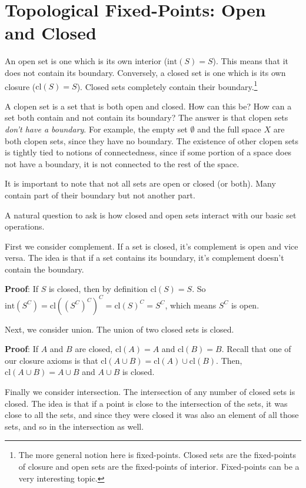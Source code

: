 \documentclass{report}
\newcommand{\cl}{\mathrm{cl}}
\newcommand{\intr}{\mathrm{int}}
\begin{document}
\section{Topological Fixed-Points: Open and Closed}

An open set is one which is its own interior ($\intr(S) = S$). This means that it does not contain its boundary. Conversely, a closed set is one which is its own closure ($\cl(S) = S$). Closed sets completely contain their boundary.\footnote{The more general notion here is fixed-points. Closed sets are the fixed-points of closure and open sets are the fixed-points of interior. Fixed-points can be a very interesting topic.}

A clopen set is a set that is both open and closed. How can this be? How can a set both contain and not contain its boundary? The answer is that clopen sets \emph{don't have a boundary}. For example, the empty set $∅$ and the full space $X$ are both clopen sets, since they have no boundary. The existence of other clopen sets is tightly tied to notions of connectedness, since if some portion of a space does not have a boundary, it is not connected to the rest of the space.

It is important to note that not all sets are open or closed (or both). Many contain part of their boundary but not another part.

A natural question to ask is how closed and open sets interact with our basic set operations.

First we consider complement. If a set is closed, it's complement is open and vice versa. The idea is that if a set contains its boundary, it's complement doesn't contain the boundary.

{\bf Proof}: If $S$ is closed, then by definition $\cl(S) = S$. So $\intr(S^C) = \cl((S^C)^C)^C = \cl(S)^C = S^C$, which means $S^C$ is open.

Next, we consider union. The union of two closed sets is closed. 

{\bf Proof}: If $A$ and $B$ are closed, $\cl(A) = A$ and $\cl(B) = B$. Recall that one of our closure axioms is that $\cl(A∪B) = \cl(A)∪\cl(B)$. Then, $\cl(A∪B) = A∪B$ and $A∪B$ is closed.

Finally we consider intersection. The intersection of any number of closed sets is closed. The idea is that if a point is close to the intersection of the sets, it was close to all the sets, and since they were closed it was also an element of all those sets, and so in the intersection as well.
\end{document}
